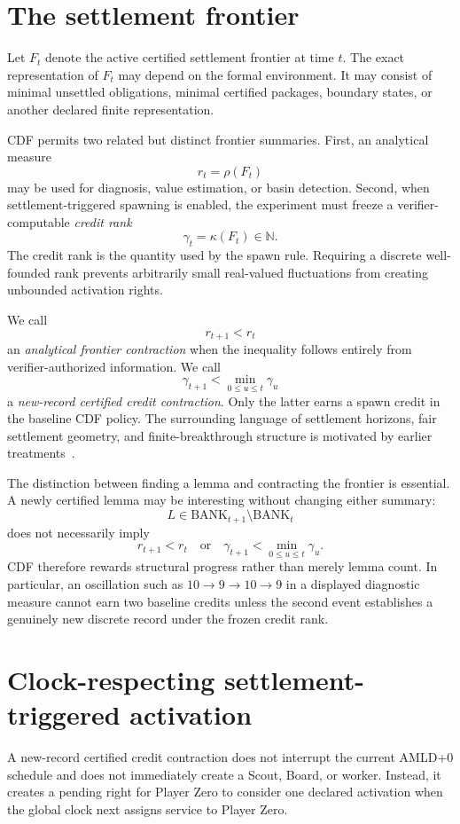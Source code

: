 \documentclass[11pt]{article}
\theoremstyle{definition}
\newcommand{\BANK}{\mathrm{BANK}}
\begin{document}
\section{The settlement frontier}

Let $F_t$ denote the active certified settlement frontier at time $t$. The exact representation of $F_t$ may depend on the formal environment. It may consist of minimal unsettled obligations, minimal certified packages, boundary states, or another declared finite representation.

CDF permits two related but distinct frontier summaries. First, an analytical measure
\[
r_t=\rho(F_t)
\]
may be used for diagnosis, value estimation, or basin detection. Second, when settlement-triggered spawning is enabled, the experiment must freeze a verifier-computable \emph{credit rank}
\[
\gamma_t=\kappa(F_t)\in\mathbb N.
\]
The credit rank is the quantity used by the spawn rule. Requiring a discrete well-founded rank prevents arbitrarily small real-valued fluctuations from creating unbounded activation rights.

We call
\[
r_{t+1}<r_t
\]
an \emph{analytical frontier contraction} when the inequality follows entirely from verifier-authorized information. We call
\[
\gamma_{t+1}<\min_{0\le u\le t}\gamma_u
\]
a \emph{new-record certified credit contraction}. Only the latter earns a spawn credit in the baseline CDF policy. The surrounding language of settlement horizons, fair settlement geometry, and finite-breakthrough structure is motivated by earlier treatments~\cite{tenneson-roundrobin,tenneson-preorders,tenneson-horizons}.

The distinction between finding a lemma and contracting the frontier is essential. A newly certified lemma may be interesting without changing either summary:
\[
L\in\BANK_{t+1}\setminus\BANK_t
\]
does not necessarily imply
\[
r_{t+1}<r_t
\quad\text{or}\quad
\gamma_{t+1}<\min_{0\le u\le t}\gamma_u.
\]
CDF therefore rewards structural progress rather than merely lemma count. In particular, an oscillation such as $10\to9\to10\to9$ in a displayed diagnostic measure cannot earn two baseline credits unless the second event establishes a genuinely new discrete record under the frozen credit rank.


\section{Clock-respecting settlement-triggered activation}

A new-record certified credit contraction does not interrupt the current AMLD+0 schedule and does not immediately create a Scout, Board, or worker. Instead, it creates a pending right for Player Zero to consider one declared activation when the global clock next assigns service to Player Zero.
\end{document}
